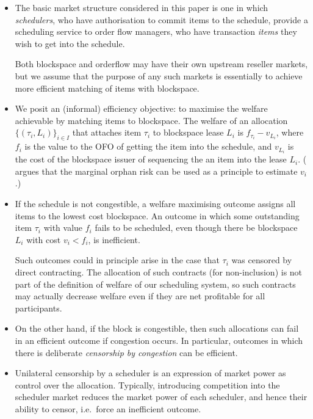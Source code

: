 \begin{itemize}

  \item
    The basic market structure considered in this paper is one in which \emph{schedulers}, who have authorisation to commit items to the schedule, provide a scheduling service to order flow managers, who have transaction \emph{items} they wish to get into the schedule.

    Both blockspace and orderflow may have their own upstream reseller markets, but we assume that the purpose of any such markets is essentially to achieve more efficient matching of items with blockspace.

  \item
    We posit an (informal) efficiency objective: to maximise the welfare achievable by matching items to blockspace.
    The welfare of an allocation $\{(\tau_i,L_i)\}_{i\in I}$ that attaches item $\tau_i$ to blockspace lease $L_i$ is $f_{\tau_i}-v_{L_i}$, where $f_i$ is the value to the OFO of getting the item into the schedule, and $v_{L_i}$ is the cost of the blockspace issuer of sequencing the an item into the lease $L_i$.
    (\cite{roughgarden2024transaction} argues that the marginal orphan risk can be used as a principle to estimate $v_i$.)
    
  \item
    If the schedule is not congestible, a welfare maximising outcome assigns all items to the lowest cost blockspace.
    An outcome in which some outstanding item $\tau_i$ with value $f_i$ fails to be scheduled, even though there be blockspace $L_i$ with cost $v_i<f_i$, is inefficient.
    
    Such outcomes could in principle arise in the case that $\tau_i$ was censored by direct contracting.
    The allocation of such contracts (for non-inclusion) is not part of the definition of welfare of our scheduling system, so such contracts may actually decrease welfare even if they are net profitable for all participants.

  \item 
    On the other hand, if the block is congestible, then such allocations can fail in an efficient outcome if congestion occurs.
    In particular, outcomes in which there is deliberate \emph{censorship by congestion} can be efficient.

  \item 
    Unilateral censorship by a scheduler is an expression of market power as control over the allocation. 
    Typically, introducing competition into the scheduler market reduces the market power of each scheduler, and hence their ability to censor, i.e.~force an inefficient outcome.


\end{itemize}
